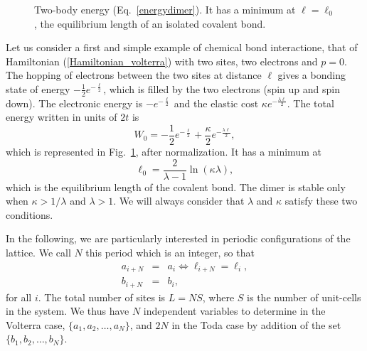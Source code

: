 \documentclass[]{revtex4-1}
\begin{document}
\begin{itemize}
\end{itemize}
 
  \begin{figure}[t]
\begin{center}   
\end{center}        \caption{Two-body energy (Eq.~\ref{energydimer}). It has a minimum at $\ell=\ell_0$, the equilibrium length of an isolated covalent bond.}
  \label{2bodypotential}
 \end{figure}

Let us consider a first and simple example of chemical bond interactione, that of Hamiltonian (\ref{Hamiltonian_volterra}) with two sites, two electrons and $p=0$. 
 The hopping of electrons between the two sites at distance $\ell$ gives a bonding state of energy $-\frac{1}{2} e^{-\frac{\ell}{2}}$, which is filled by the two electrons (spin up and spin down). The electronic energy is $- e^{-\frac{\ell}{2}}$ and the elastic cost $\kappa e^{-\frac{\lambda \ell}{2}}$. The total energy written in units of $2t$ is 
\begin{equation}
  W_0=-\frac{1}{2} e^{-\frac{\ell}{2}}+ \frac{\kappa}{2} e^{-\frac{\lambda \ell}{2}}, \label{energydimer}
\end{equation}
which is represented in Fig.~\ref{2bodypotential}, after normalization. It has a minimum at \begin{equation} \ell_0=\frac{2}{\lambda-1} \ln (\kappa \lambda), \label{l0} \end{equation} which is the equilibrium length of the covalent bond. The dimer is stable only when $\kappa > 1 /\lambda$ and $\lambda>1$. We will always consider that $\lambda$ and $\kappa$ satisfy these two conditions.



In the following, we are particularly interested in periodic configurations of the lattice. We call $N$ this period which is an integer, so that
\begin{eqnarray}
   a_{i+N} &=& a_i \Leftrightarrow \ell_{i+N} = \ell_i, \\ b_{i+N} &=& b_i,
 \end{eqnarray}
for all $i$. The total number of sites is $L=NS$, where $S$ is the number of unit-cells in the system. 
We thus have $N$ independent variables to determine in the Volterra case, $\{a_1, a_2,\dots, a_N\}$, and $2N$ in the Toda case by addition of the set $\{b_1, b_2,\dots, b_N\}$.
\end{document}

